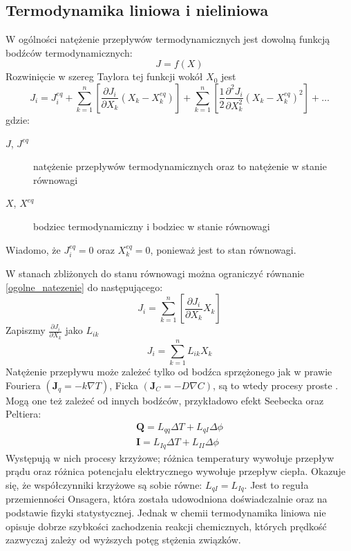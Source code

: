 \documentclass[10pt, a4paper, twoside, onecolumn]{article}
\numberwithin{equation}{section}
\begin{document}
	\subsection{Termodynamika liniowa i nieliniowa}
	W ogólności natężenie przepływów termodynamicznych jest dowolną funkcją bodźców termodynamicznych: 
	\[J=f\left(X\right)\]
	Rozwinięcie w szereg Taylora tej funkcji wokół \(X_{0}\) jest
	\begin{equation}\label{ogolne_natezenie}
		J_{i}=J_{i}^{eq}+\sum_{k=1}^{n}\left[\frac{\partial J_{i}}{\partial X_{k}}\left(X_{k}-X_{k}^{eq}\right)\right]+\sum_{k=1}^{n}\left[\frac{1}{2}\frac{\partial^{2} J_{i}}{\partial X_{k}^{2}}\left(X_{k}-X_{k}^{eq}\right)^{2}\right]+\ldots
	\end{equation}
	gdzie:
	\begin{description}
		\item[\(J\), \(J^{eq}\)] natężenie przepływów termodynamicznych oraz to natężenie w stanie równowagi
		\item[\(X\), \(X^{eq}\)] bodziec termodynamiczny i bodziec w stanie równowagi
	\end{description}
	Wiadomo, że \(J_{i}^{eq}=0\) oraz \(X_{k}^{eq}=0\), ponieważ jest to stan równowagi. \par
	W stanach zbliżonych do stanu równowagi można ograniczyć równanie \eqref{ogolne_natezenie} do następującego: 
	\begin{equation}\label{natezenie_liniowe}
		J_{i}=\sum_{k=1}^{n}\left[\frac{\partial J_{i}}{\partial X_{k}}X_{k}\right]
	\end{equation}
	Zapiszmy \(\frac{\partial J_{i}}{\partial X_{k}}\) jako \(L_{ik}\)
	\begin{equation}
		J_{i}=\sum_{k=1}^{n}L_{ik}X_{k}
	\end{equation}
	Natężenie przepływu może zależeć tylko od bodźca sprzężonego jak w prawie Fouriera \(\left(\boldsymbol{J}_{q}=-k\nabla T\right)\), Ficka \(\left(\boldsymbol{J}_{C}=-D\nabla C\right)\), są to wtedy procesy proste \cite{orlik}. Mogą one też zależeć od innych bodźców, przykładowo efekt Seebecka oraz Peltiera:
	\begin{gather}
		\boldsymbol{Q}=L_{qq}\Delta T+L_{qI}\Delta \phi \\
		\boldsymbol{I}=L_{Iq}\Delta T+L_{II}\Delta \phi
	\end{gather}\cite{Ceynowa2008}
	Występują w nich procesy krzyżowe; różnica temperatury wywołuje przepływ prądu oraz różnica potencjału elektrycznego wywołuje przepływ ciepła.
	Okazuje się, że współczynniki krzyżowe są sobie równe: \(L_{qI}=L_{Iq}\). Jest to reguła przemienności Onsagera, która została udowodniona doświadczalnie oraz na podstawie fizyki statystycznej. 
	Jednak w chemii termodynamika liniowa nie opisuje dobrze szybkości zachodzenia reakcji chemicznych, których prędkość zazwyczaj zależy od wyższych potęg stężenia związków. \par
	
\end{document}
